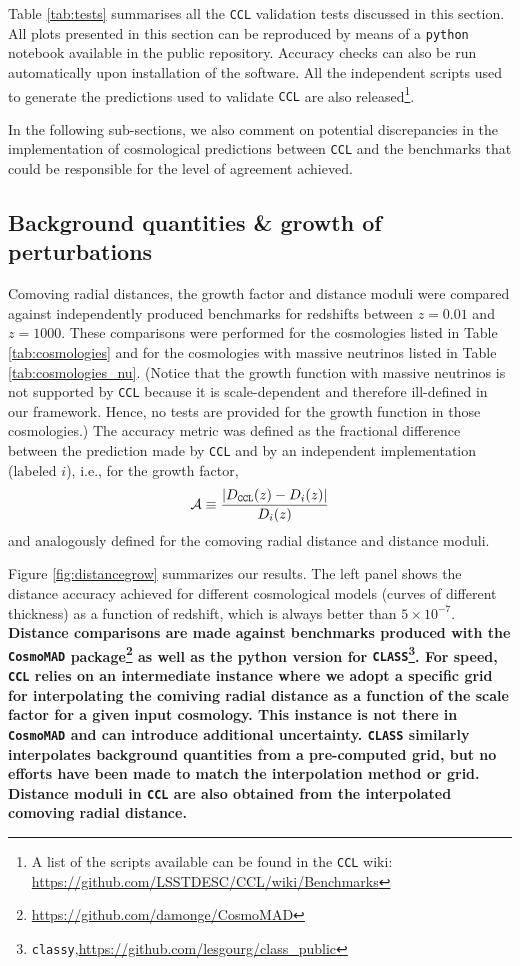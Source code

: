 \documentclass[\docopts]{\docclass}
\newcommand{\ccl}{{\tt CCL}\xspace}
\newcommand{\class}{{\tt CLASS}\xspace}
\begin{document}


Table \ref{tab:tests} summarises all the \ccl validation tests discussed in this section. All plots presented in this section can be reproduced by means of a {\tt python} notebook available in the public repository. Accuracy checks can also be run automatically upon installation of the software. All the independent scripts used to generate the predictions used to validate \ccl are also released\footnote{A list of the scripts available can be found in the \ccl wiki: \url{https://github.com/LSSTDESC/CCL/wiki/Benchmarks}}.

In the following sub-sections, we also comment on potential discrepancies in the implementation of cosmological predictions between \ccl and the benchmarks that could be responsible for the level of agreement achieved.

\subsection{Background quantities \& growth of perturbations}

Comoving radial distances, the growth factor and distance moduli were compared against independently produced benchmarks for redshifts between $z = 0.01$ and $z = 1000$. These comparisons were performed for the cosmologies listed in Table \ref{tab:cosmologies} and for the cosmologies with massive neutrinos listed in Table \ref{tab:cosmologies_nu}. (Notice that the growth function with massive neutrinos is not supported by \ccl because it is scale-dependent and therefore ill-defined in our framework. Hence, no tests are provided for the growth function in those cosmologies.) The accuracy metric was defined as the fractional difference between the prediction made by \ccl and by an independent implementation (labeled $i$), i.e., for the growth factor,
\begin{equation}
  \mathcal{A} \equiv \frac{|D_{\tt CCL}(z)-D_{i}(z)|}{D_i(z)}
\end{equation}
and analogously defined for the comoving radial distance and distance moduli.

Figure \ref{fig:distancegrow} summarizes our results. The left panel shows the distance accuracy achieved for different cosmological models (curves of different thickness) as a function of redshift, which is always better than $5\times 10^{-7}$. {\bf Distance comparisons are made against benchmarks produced with the {\tt CosmoMAD} package\footnote{\url{https://github.com/damonge/CosmoMAD}} as well as the python version for {\tt CLASS}\footnote{{\tt classy},\url{https://github.com/lesgourg/class_public}}. For speed, \ccl relies on an intermediate instance where we adopt a specific grid for interpolating the comiving radial distance as a function of the scale factor for a given input cosmology. This instance is not there in {\tt CosmoMAD} and can introduce additional uncertainty. \class similarly interpolates background quantities from a pre-computed grid, but no efforts have been made to match the interpolation method or grid. Distance moduli in \ccl are also obtained from the interpolated comoving radial distance.}
\end{document}
